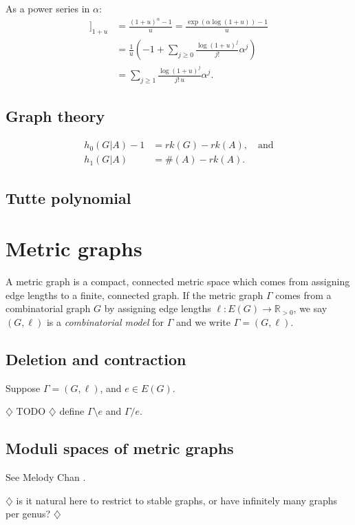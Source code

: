 \documentclass{amsart}
\theoremstyle{definition}
\newcommand{\RR}{\mathbb{R}}
\newcommand{\RRpos}{\RR_{>0}}
\newcommand{\fanalog}[2]{[\![#2]\!]_{#1}}
\newcommand{\harry}[1]{{\color{red} \sf $\diamondsuit$  {#1} $\diamondsuit$ }}
\newcommand{\note}[1]{\harry{#1}}
\begin{document}
As a power series in $\alpha$:
\begin{align*}
\fanalog{1 + u}{\alpha} &= \frac{(1+u)^\alpha - 1}{u}
= \frac{\exp(\alpha \log(1+u)) - 1}{u} \\
&= \frac1{u} \left( -1 + \sum_{j\geq 0} \frac{\log(1+u)^j}{j!} \alpha^j\right) \\
&= \sum_{j\geq 1} \frac{\log(1+u)^j}{j! \, u} \alpha^j .
\end{align*}

\subsection{Graph theory}
\begin{align*}
h_0(G| A) - 1 &= rk(G) - rk(A), \quad\text{and}\\
h_1(G| A) &= \#(A) - rk(A) .
\end{align*}


\subsection{Tutte polynomial}

\section{Metric graphs}
A metric graph is a compact, connected metric space which comes from 
assigning edge lengths to a finite, connected graph.
If the metric graph $\Gamma$
comes from a combinatorial graph $G$ by 
assigning edge lengths $\ell : E(G) \to \RRpos$,
we say $(G,\ell)$ is a {\em combinatorial model} for $\Gamma$
and we write $\Gamma = (G,\ell)$.

\subsection{Deletion and contraction}

Suppose $\Gamma = (G,\ell)$, and $e \in E(G)$.

\note{TODO} define $\Gamma \setminus e$ and $\Gamma / e$.

\subsection{Moduli spaces of metric graphs}
See Melody Chan \cite{Cha}.

\cite{ACP}

\note{is it natural here to restrict to stable graphs, or have infinitely many graphs per genus?}
\end{document}
